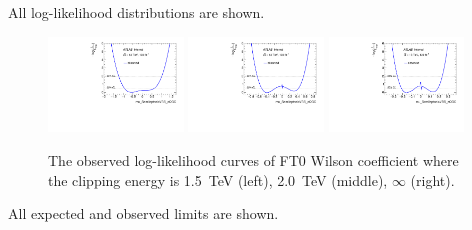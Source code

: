 
All log-likelihood distributions are shown.

\begin{figure}[ht]
    \centering
    \includegraphics[width=0.32\textwidth]{figures/aQGC/profileFT01500}
    	\includegraphics[width=0.32\textwidth]{figures/aQGC/profileFT02000}
        \includegraphics[width=0.32\textwidth]{figures/aQGC/profileFT0inf}
        \caption{The observed log-likelihood curves of FT0 Wilson coefficient where the clipping energy is 1.5~TeV (left), 2.0~TeV (middle), $\infty$ (right).}
        \label{fig:ProfileLL}
\end{figure}



All expected and observed limits are shown.

